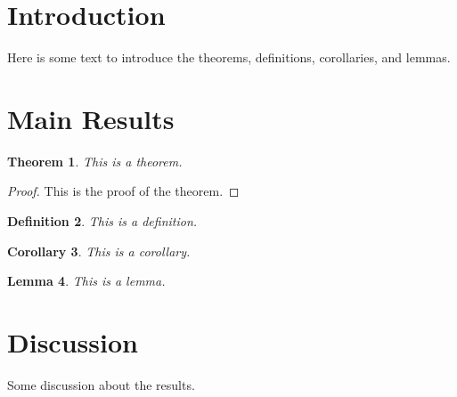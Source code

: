 \documentclass{article}
\newtheorem{theorem}{Theorem}[section]
\newtheorem{definition}[theorem]{Definition}
\newtheorem{corollary}[theorem]{Corollary}
\newtheorem{lemma}[theorem]{Lemma}
\begin{document}
\section{Introduction}
Here is some text to introduce the theorems, definitions, corollaries, and lemmas.
\section{Main Results}
\begin{theorem}
This is a theorem.
\end{theorem}
\begin{proof}
This is the proof of the theorem.
\end{proof}
\begin{definition}
This is a definition.
\end{definition}
\begin{corollary}
This is a corollary.
\end{corollary}
\begin{lemma}
This is a lemma.
\end{lemma}
\section{Discussion}
Some discussion about the results.
\end{document}

